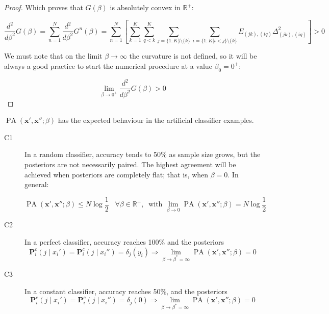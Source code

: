 \begin{proof}
Which proves that $G(\beta)$ is absolutely convex in $\mathbb{R}^+$:

$$
 \frac{d^2}{d \beta ^2} G(\beta) = \sum_{n=1}^N \frac{d^2}{d \beta ^2} G^n(\beta) = \sum_{n=1}^N \left[ \sum_{k=1}^K \sum_{q<k}^K \sum_{j = \{ 1:K \} \setminus \{ k \} } \sum_{i = \{ 1:K | i < j\} \setminus \{ k \} } E_{(jk),(iq)}\Delta_{(jk),(iq)}^2 \right] > 0
$$

We must note that on the limit $\beta \to \infty$ the curvature is not defined, so it will be always a good practice to start the numerical procedure at a value $\beta_0 = 0^+$:

$$
\lim_{\beta \to 0^+} \frac{d^2}{d \beta ^2} G(\beta) > 0
$$

\end{proof}


\begin{properties}
    $\operatorname{PA}\left(\bm{x}', \bm{x}'' ; \beta\right)$ has the expected behaviour in
    the artificial classifier examples.
    
    \begin{description}
        \item[C1] In a random classifier, accuracy tends to 50\% as sample size grows, but the posteriors 
        are not necessarily paired. The highest agreement will be achieved when posteriors are
        completely flat; that is, when $\beta = 0$. In general:
    
        $$
        \operatorname{PA}\left(\bm{x}', \bm{x}'' ; \beta \right) \leq N \log \frac{1}{2} \;\;\; \forall \beta \in \mathbb{R}^+, \;\; \text{with } \lim_{\beta \to 0} \operatorname{PA}\left(\bm{x}', \bm{x}'' ; \beta \right) = N \log \frac{1}{2}
        $$

        \item[C2] In a perfect classifier, accuracy reaches 100\% and the posteriors
        $$
        \mathbf{P}_i^c(j \mid x_i ') = \mathbf{P}_i^c(j \mid x_i '') = \delta_j(y_i) \Longrightarrow \lim_{\beta \to \beta^{*} = \infty} \operatorname{PA}\left(\bm{x}', \bm{x}'' ; \beta \right) = 0
        $$
        \item[C3] In a constant classifier, accuracy reaches 50\%, and the posteriors
        $$
        \mathbf{P}_i^c(j \mid x_i ') = \mathbf{P}_i^c(j \mid x_i '') = \delta_j(0) \Longrightarrow \lim_{\beta \to \beta^{*} = \infty} \operatorname{PA}\left(\bm{x}', \bm{x}'' ; \beta \right) = 0
        $$
        
    \end{description}
\end{properties}





